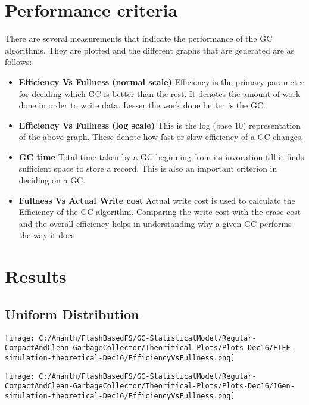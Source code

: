 \section{Performance criteria}
	There are several measurements that indicate the performance of the GC algorithms. They are plotted and the different graphs that are generated are as follows:
\begin{itemize}
\item {\bf Efficiency Vs Fullness (normal scale)}
\subitem Efficiency is the primary parameter for deciding which GC is better than the rest. It denotes the amount of work done in order to write data. Lesser the work done better is the GC.
\item {\bf Efficiency Vs Fullness (log scale)}
\subitem This is the log (base 10) representation of the above graph. These denote how fast or slow efficiency of a GC changes. 
\item {\bf GC time}
\subitem Total time taken by a GC beginning from its invocation till it finds sufficient space to store a record. This is also an important criterion in deciding on a GC.
\item {\bf Fullness Vs Actual Write cost}
\subitem Actual write cost is used to calculate the Efficiency of the GC algorithm. Comparing the write cost with the erase cost and the overall efficiency helps in understanding why a given GC performs the way it does.
\end{itemize}


\section{Results}

\subsection{Uniform Distribution}

\begin{SCfigure}
	\centering
	\texttt{[image: C:/Ananth/FlashBasedFS/GC-StatisticalModel/Regular-CompactAndClean-GarbageCollector/Theoritical-Plots/Plots-Dec16/FIFE-simulation-theoretical-Dec16/EfficiencyVsFullness.png]}
\end{SCfigure}

\begin{SCfigure}
	\texttt{[image: C:/Ananth/FlashBasedFS/GC-StatisticalModel/Regular-CompactAndClean-GarbageCollector/Theoritical-Plots/Plots-Dec16/1Gen-simulation-theoretical-Dec16/EfficiencyVsFullness.png]}
\end{SCfigure}

